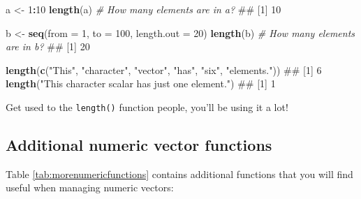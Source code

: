 \documentclass[]{book}
\newenvironment{Shaded}{\begin{snugshade}}{\end{snugshade}}
\newcommand{\KeywordTok}[1]{\textcolor[rgb]{0.13,0.29,0.53}{\textbf{#1}}}
\newcommand{\DataTypeTok}[1]{\textcolor[rgb]{0.13,0.29,0.53}{#1}}
\newcommand{\DecValTok}[1]{\textcolor[rgb]{0.00,0.00,0.81}{#1}}
\newcommand{\StringTok}[1]{\textcolor[rgb]{0.31,0.60,0.02}{#1}}
\newcommand{\CommentTok}[1]{\textcolor[rgb]{0.56,0.35,0.01}{\textit{#1}}}
\newcommand{\OperatorTok}[1]{\textcolor[rgb]{0.81,0.36,0.00}{\textbf{#1}}}
\newcommand{\NormalTok}[1]{#1}
\theoremstyle{definition}
\theoremstyle{definition}
\theoremstyle{remark}
\begin{document}
\begin{Shaded}
\begin{Highlighting}[]
\NormalTok{a <-}\StringTok{ }\DecValTok{1}\OperatorTok{:}\DecValTok{10}
\KeywordTok{length}\NormalTok{(a)  }\CommentTok{# How many elements are in a?}
\NormalTok{## [1] 10}

\NormalTok{b <-}\StringTok{ }\KeywordTok{seq}\NormalTok{(}\DataTypeTok{from =} \DecValTok{1}\NormalTok{, }\DataTypeTok{to =} \DecValTok{100}\NormalTok{, }\DataTypeTok{length.out =} \DecValTok{20}\NormalTok{)}
\KeywordTok{length}\NormalTok{(b)  }\CommentTok{# How many elements are in b?}
\NormalTok{## [1] 20}

\KeywordTok{length}\NormalTok{(}\KeywordTok{c}\NormalTok{(}\StringTok{"This"}\NormalTok{, }\StringTok{"character"}\NormalTok{, }\StringTok{"vector"}\NormalTok{, }\StringTok{"has"}\NormalTok{, }\StringTok{"six"}\NormalTok{, }\StringTok{"elements."}\NormalTok{))}
\NormalTok{## [1] 6}
\KeywordTok{length}\NormalTok{(}\StringTok{"This character scalar has just one element."}\NormalTok{)}
\NormalTok{## [1] 1}
\end{Highlighting}
\end{Shaded}

Get used to the \texttt{length()} function people, you'll be using it a
lot!

\subsection{Additional numeric vector
functions}\label{additional-numeric-vector-functions}

Table \ref{tab:morenumericfunctions} contains additional functions that
you will find useful when managing numeric vectors:
\end{document}
